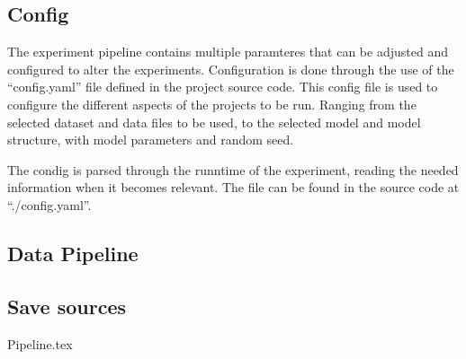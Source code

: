 

\subsection{Config}
The experiment pipeline contains multiple paramteres that can be adjusted and configured to alter the experiments.
Configuration is done through the use of the ``config.yaml'' file defined in the project source code.
This config file is used to configure the different aspects of the projects to be run.
Ranging from the selected dataset and data files to be used, to the selected model and model structure, with model parameters and random seed.

The condig is parsed through the runntime of the experiment, reading the needed information when it becomes relevant.
The file can be found in the source code at ``./config.yaml''.

\subsection{Data Pipeline}




\subsection{Save sources}

{Pipeline.tex}